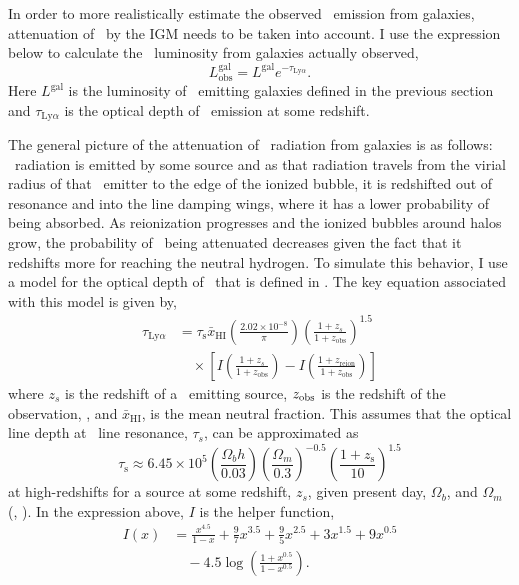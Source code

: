 In order to more realistically estimate the observed \lya\ emission from galaxies,
attenuation of \lya\ by the IGM needs to be taken into account. I use the expression
below to calculate the \lya\ luminosity from galaxies actually observed,
\begin{equation}
L^{\textrm{gal}}_{\textrm{obs}} = L^{\textrm{gal}} e^{-\tau_{\textrm{Ly}\alpha}}.
\end{equation}
Here $L^{\textrm{gal}}$ is the luminosity of \lya\ emitting galaxies defined in the previous section and
$\tau_{\textrm{Ly}\alpha}$ is the optical depth of \lya\ emission at some redshift.

The general picture of the attenuation of \lya\ radiation from galaxies is as follows:
\lya\ radiation is emitted by some source and as that radiation travels from the virial
radius of that \lya\ emitter to the edge of the ionized bubble, it is redshifted
out of resonance and into the line damping wings, where it has a lower probability of
being absorbed. As reionization progresses and the ionized bubbles around halos grow,
the probability of \lya\ being attenuated decreases given the fact that it redshifts more
for reaching the neutral hydrogen. To simulate this behavior, I use a
model for the optical depth of \lya\ that is defined in \cite{1998ApJ...501...15M}. The
key equation associated with this model is given by,
\begin{align}
\tau_{\textrm{Ly}\alpha} &= \tau_{\textrm{s}} \bar{x}_{\textrm{HI}} \left( \frac{2.02 \times 10^{-8}}{\pi}\right) \left(\frac{1 + z_s}{1 + z_{\textrm{obs}}} \right)^{1.5} \nonumber \\
& \hspace{1em} \times \left[ I\left(\frac{1 + z_s}{1 + z_{\textrm{obs}}} \right) - I\left(\frac{1 + z_{\textrm{reion}}}{1 + z_{\textrm{obs}}}\right) \right]
\end{align}
where $z_{s}$ is the redshift of a \lya\ emitting source, $z_{\rm obs}$ is the redshift of the observation,
, and $\bar{x}_{\textrm{HI}}$, is the mean neutral fraction. This assumes that
the optical line depth at \lya\ line resonance, $\tau_s$, can be approximated as
\begin{equation}
\tau_{\textrm{s}} \approx  6.45 \times 10^5 \left( \frac{\Omega_b h}{0.03}\right) \left( \frac{\Omega_m}{0.3}\right)^{-0.5} \left(  \frac{1 + z_{\textrm{s}}}{10}\right)^{1.5}
\end{equation}
at high-redshifts for a source at some redshift, $z_{s}$, given present day, $\Omega_b$, and $\Omega_m$ (\cite{1965ApJ...142.1633G}, \cite{2001PhR...349..125B}). In the expression
above, $I$ is the helper function,
\begin{align}
I \left(x \right) &= \frac{x^{4.5}}{1 - x} + \frac{9}{7}x^{3.5} + \frac{9}{5}x^{2.5} + 3 x^{1.5} + 9 x^{0.5} \nonumber \\
                & \hspace{1em}- 4.5 \log \left( \frac{1 + x^{0.5}}{1 - x^{0.5}}\right).
\end{align}

